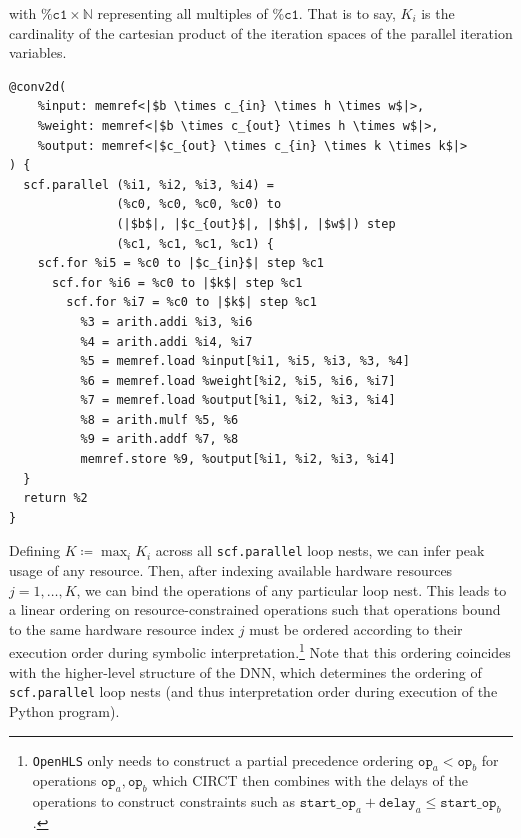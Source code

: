 \documentclass[10pt]{sig-alternate}
\begin{document}
\noindent
with $\texttt{\%c1}\times\mathbb{N}$ representing all multiples of
$\texttt{\%c1}$. That is to say, $K_{i}$ is the cardinality of the
cartesian product of the iteration spaces of the parallel iteration
variables.
\begin{listing}
\begin{verbatim}
@conv2d(
    %input: memref<|$b \times c_{in} \times h \times w$|>,
    %weight: memref<|$b \times c_{out} \times h \times w$|>,
    %output: memref<|$c_{out} \times c_{in} \times k \times k$|>
) {
  scf.parallel (%i1, %i2, %i3, %i4) =
               (%c0, %c0, %c0, %c0) to
               (|$b$|, |$c_{out}$|, |$h$|, |$w$|) step
               (%c1, %c1, %c1, %c1) {
    scf.for %i5 = %c0 to |$c_{in}$| step %c1
      scf.for %i6 = %c0 to |$k$| step %c1
        scf.for %i7 = %c0 to |$k$| step %c1
          %3 = arith.addi %i3, %i6
          %4 = arith.addi %i4, %i7
          %5 = memref.load %input[%i1, %i5, %i3, %3, %4]
          %6 = memref.load %weight[%i2, %i5, %i6, %i7]
          %7 = memref.load %output[%i1, %i2, %i3, %i4]
          %8 = arith.mulf %5, %6
          %9 = arith.addf %7, %8
          memref.store %9, %output[%i1, %i2, %i3, %i4]
  }
  return %2
}
\end{verbatim}
\caption{Parallel loop representation of %
Listing~\ref{lis:Single-filter-convolution}\label{lis:Single-filter-convolution-2-2}, exhibiting explicitly
the resource partitioning and ordering strategy we employ  to construct a feasible schedule of operations.}
\end{listing}

Defining $K\coloneqq\max_{i}K_{i}$ across all \texttt{scf.parallel}
loop nests, we can infer peak usage of any resource. Then, after indexing
available hardware resources $j=1,\dots,K$, we can bind the operations
of any particular loop nest. This leads to a linear ordering on resource-constrained
operations such that operations bound to the same hardware resource
index $j$ must be ordered according to their execution order during
symbolic interpretation.\footnote{\texttt{OpenHLS} only needs to construct a partial precedence ordering
$\texttt{op}_{a}<\texttt{op}_{b}$ for operations $\texttt{op}_{a},\texttt{op}_{b}$
which CIRCT then combines with the delays of the operations to construct
constraints such as $\texttt{start\_op}_{a}+\texttt{delay}_{a}\leq\texttt{start\_op}_{b}$.} Note that this ordering coincides with the higher-level structure of
the DNN, which determines the ordering of\texttt{ scf.parallel} loop nests (and thus
interpretation order during execution of the Python program).
\end{document}
